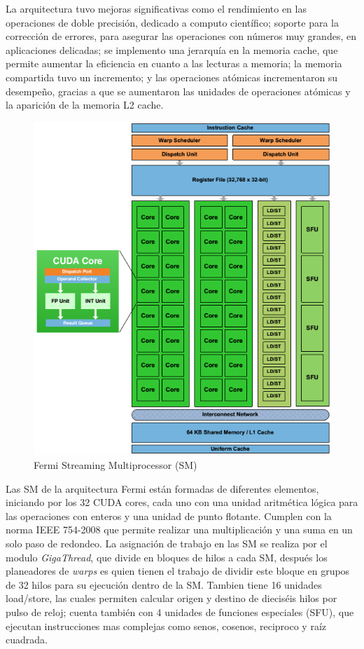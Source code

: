 La arquitectura tuvo mejoras significativas como el rendimiento en las operaciones de doble precisión, dedicado a computo científico; soporte para la corrección de errores, para asegurar las operaciones con números muy grandes, en aplicaciones delicadas; se implemento una jerarquía en la memoria cache, que permite aumentar la eficiencia en cuanto a las  lecturas a memoria; la memoria compartida tuvo un incremento; y las operaciones atómicas incrementaron su desempeño, gracias a que se aumentaron las unidades de operaciones atómicas y la aparición de la memoria L2 cache. 

\begin{figure}[ph]
			\centering
				\includegraphics[scale=0.6]{img/fermiSM.png}
			\caption{Fermi Streaming Multiprocessor (SM)\cite{fermi}}
\end{figure}

Las SM de la arquitectura Fermi están formadas de diferentes elementos, iniciando por los 32 CUDA cores, cada uno con una unidad aritmética lógica para las operaciones con enteros y una unidad de punto flotante. Cumplen con la norma IEEE 754-2008 que permite realizar una multiplicación y una suma en un solo paso de redondeo. La asignación de trabajo en las SM se realiza por el modulo \textit{GigaThread}, que divide en bloques de hilos a cada SM, después los planeadores de \textit{warps} es quien tienen el trabajo de dividir este bloque en grupos de 32 hilos para su ejecución dentro de la SM. Tambien tiene 16 unidades load/store, las cuales permiten calcular origen y destino de dieciséis hilos por pulso de reloj; cuenta también con 4 unidades de funciones especiales (SFU), que ejecutan instrucciones mas complejas como senos, cosenos, reciproco y raíz cuadrada. 
\pagebreak
